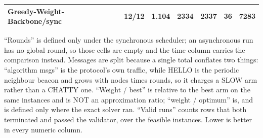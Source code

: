 \begin{table}[tb]
\begin{tabular}{lrrrrrr}
Greedy-Weight-Backbone/sync & 12/12 & 1.104 & 2334 & 2337 & 36 & 7283 \\
\bottomrule
\end{tabular}
\begin{flushleft}\footnotesize
``Rounds'' is defined only under the synchronous scheduler; an asynchronous run has no global round, so those cells are empty and the time column carries the comparison instead. Messages are split because a single total conflates two things: ``algorithm msgs'' is the protocol's own traffic, while HELLO is the periodic neighbour beacon and grows with nodes times rounds, so it charges a SLOW arm rather than a CHATTY one. ``Weight / best'' is relative to the best arm on the same instances and is NOT an approximation ratio; ``weight / optimum'' is, and is defined only where the exact solver ran. ``Valid runs'' counts rows that both terminated and passed the validator, over the feasible instances. Lower is better in every numeric column.
\end{flushleft}
\end{table}
